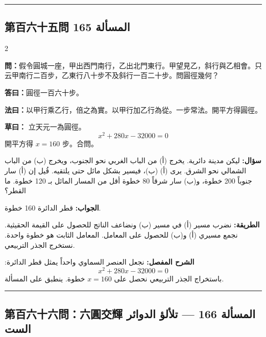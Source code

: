 \documentclass[11pt,a4paper]{article}
\newcommand{\ar}[1]{\arabicfont\beginR #1\endR}
\newcommand{\arb}[1]{\textbf{\arabicfont\beginR #1\endR}}
\newcommand{\longline}{\noindent\rule{\textwidth}{0.4pt}}
\newcommand{\arnote}[1]{\textcolor{arabicblue}{\ar{#1}}}
\newcommand{\wen}[1]{\par\noindent\textbf{\textcolor{probcolor}{問：}}{#1}\par}
\newcommand{\da}[1]{\par\noindent\textbf{\textcolor{anscolor}{答曰：}}{#1}\par}
\newcommand{\fayue}[1]{\par\noindent\textbf{\textcolor{methodcolor}{法曰：}}{#1}\par}
\newcommand{\caoyue}[1]{\par\noindent\textbf{草曰：}{#1}\par}
\newcommand{\arwen}[1]{\par\noindent\arb{سؤال: }\arnote{#1}\par}
\newcommand{\arjwb}[1]{\par\noindent\arb{الجواب: }\arnote{#1}\par}
\newcommand{\arqwd}[1]{\par\noindent\arb{الطريقة: }\arnote{#1}\par}
\newcommand{\arshr}[1]{\par\noindent\arb{الشرح المفصل: }\arnote{#1}\par}
\begin{document}
\vspace{0.3cm}
\longline

\subsection*{第百六十五問 \hfill \ar{المسألة 165}}

\begin{paracol}{2}

\begin{leftcolumn}
\wen{假令圓城一座，甲出西門南行，乙出北門東行。甲望見乙，斜行與乙相會。只云甲南行二百步，乙東行八十步不及斜行一百二十步。問圓徑幾何？}

\da{圓徑一百六十步。}

\fayue{以甲行乘乙行，倍之為實。以甲行加乙行為從。一步常法。開平方得圓徑。}

\caoyue{
立天元一為圓徑。
$$x^2 + 280x - 32000 = 0$$
開平方得 $x = 160$ 步。合問。}
\end{leftcolumn}

\begin{rightcolumn}
\arwen{ليكن مدينة دائرية. يخرج (أ) من الباب الغربي نحو الجنوب، ويخرج (ب) من الباب الشمالي نحو الشرق. يرى (أ) (ب)، فيسير بشكل مائل حتى يلتقيه. قُيل إن (أ) سار جنوباً 200 خطوة، و(ب) سار شرقاً 80 خطوة أقل من المسار المائل بـ 120 خطوة. ما القطر؟}

\arjwb{قطر الدائرة 160 خطوة.}

\arqwd{نضرب مسير (أ) في مسير (ب) ونضاعف الناتج للحصول على القيمة الحقيثية. نجمع مسيري (أ) و(ب) للحصول على المعامل. المعامل الثابت هو خطوة واحدة. نستخرج الجذر التربيعي.}

\arshr{نجعل العنصر السماوي واحداً يمثل قطر الدائرة:
$$x^2 + 280x - 32000 = 0$$
باستخراج الجذر التربيعي نحصل على $x = 160$ خطوة. ينطبق على المسألة.}
\end{rightcolumn}

\end{paracol}

\vspace{0.3cm}
\longline

\subsection*{第百六十六問：六圓交輝 \hfill \ar{المسألة 166 — تلألؤ الدوائر الست}}
\end{document}
